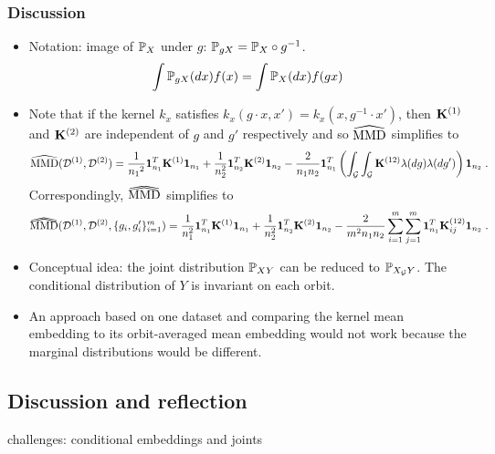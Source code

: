 \subsubsection{Discussion}

\begin{itemize}

\item
Notation: image of $\P_X$ under $g$: $\P_{gX} = \P_{X} \circ g^{-1}$.
\[
\int \P_{gX}(dx) f(x) = \int \P_X(dx) f(gx)
\]

\item
Note that if the kernel $k_x$ satisfies $k_x(g\cdot x,x')=k_x(x,g^{-1}\cdot x')$, then $\bfK^{(1)}$ and $\bfK^{(2)}$ are independent of $g$ and $g'$ respectively and so $\hatMMD$ simplifies to
\[
\hatMMD(\calD^{(1)},\calD^{(2)}) = \frac{1}{{n_1}^2}\onevec_{n_1}^T\bfK^{(1)}\onevec_{n_1} + \frac{1}{n_2^2}\onevec_{n_2}^T\bfK^{(2)}\onevec_{n_2} - \frac{2}{n_1n_2}\onevec_{n_1}^T\left(\int_\calG\int_\calG\bfK^{(12)}\lambda(dg)\lambda(dg')\right)\onevec_{n_2} \;.
\]
Correspondingly, $\dhatMMD$ simplifies to
\[
\dhatMMD(\calD^{(1)},\calD^{(2)},\{g_i,g_i'\}_{i=1}^m) = \frac{1}{n_1^2}\onevec_{n_1}^T\bfK^{(1)}\onevec_{n_1} + \frac{1}{n_2^2}\onevec_{n_2}^T\bfK^{(2)}\onevec_{n_2} - \frac{2}{m^2n_1n_2}\sum_{i=1}^m\sum_{j=1}^m\onevec_{n_1}^T\bfK_{ij}^{(12)}\onevec_{n_2} \;.
\]

\item
Conceptual idea: the joint distribution $\bbP_{XY}$ can be reduced to $\bbP_{X_\calG Y}$. The conditional distribution of $Y$ is invariant on each orbit.

\item
An approach based on one dataset and comparing the kernel mean embedding to its orbit-averaged mean embedding would not work because the marginal distributions would be different.

\end{itemize}


\subsection{Discussion and reflection} \label{sec:discussion}

\todo challenges: conditional embeddings and joints